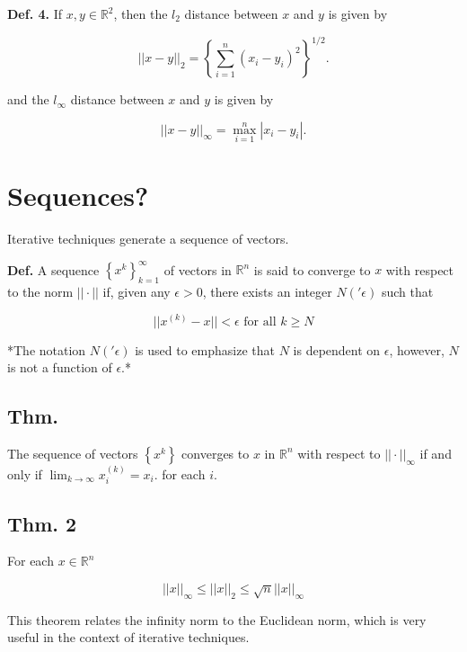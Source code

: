 \textbf{Def. 4.} If $x,y \in \mathbb{R}^2$, then the $l_2$ distance between
$x$ and $y$ is given by

\begin{equation*}
  ||x-y||_2 = \left\{ \sum_{i=1}^{n} (x_i-y_i)^2 \right\}^{1/2}
.\end{equation*}

and the $l_\infty$ distance between $x$ and $y$ is given by

\begin{equation*}
  ||x-y||_\infty = \max_{i=1}^n |x_i-y_i|
.\end{equation*}

\section{Sequences?}

Iterative techniques generate a sequence of vectors.

\textbf{Def.} A sequence $\left\{ x^k \right\}_{k=1}^\infty$ of vectors in
$\mathbb{R}^n$ is said to converge to $x$ with respect to the norm $||\cdot||$
if, given any $\epsilon > 0$, there exists an integer $N('\epsilon)$ such that

\begin{equation*}
  ||x^{(k)} - x|| < \epsilon \text{ for all } k \geq N
\end{equation*}

*The notation $N('\epsilon)$ is used to emphasize that $N$ is dependent on 
$\epsilon$, however, $N$ is not a function of $\epsilon$.*

\subsection{Thm.}

The sequence of vectors $\left\{ x^k \right\}$ converges to $x$ in $\mathbb{R}^n $
with respect to $||\cdot||_\infty$ if and only if 
$\lim_{k \to \infty} x_i^{(k)} = x_i$. for each $i$.

\subsection{Thm. 2}

For each $x\in \mathbb{R}^n $

\begin{equation*}
  ||x||_\infty \leq ||x||_2 \leq \sqrt{n} ||x||_\infty
\end{equation*}

This theorem relates the infinity norm to the Euclidean norm, which is very 
useful in the context of iterative techniques.

